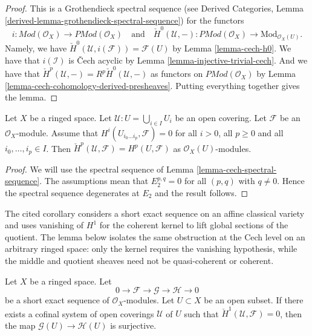 \begin{proof}
This is a Grothendieck spectral sequence
(see
Derived Categories, Lemma \ref{derived-lemma-grothendieck-spectral-sequence})
for the functors
$$
i :  \textit{Mod}(\mathcal{O}_X) \to \textit{PMod}(\mathcal{O}_X)
\quad\text{and}\quad
\check{H}^0(\mathcal{U}, - ) : \textit{PMod}(\mathcal{O}_X)
\to \text{Mod}_{\mathcal{O}_X(U)}.
$$
Namely, we have $\check{H}^0(\mathcal{U}, i(\mathcal{F})) = \mathcal{F}(U)$
by Lemma \ref{lemma-cech-h0}. We have that $i(\mathcal{I})$ is
{\v C}ech acyclic by Lemma \ref{lemma-injective-trivial-cech}. And we
have that $\check{H}^p(\mathcal{U}, -) = R^p\check{H}^0(\mathcal{U}, -)$
as functors on $\textit{PMod}(\mathcal{O}_X)$
by Lemma \ref{lemma-cech-cohomology-derived-presheaves}.
Putting everything together gives the lemma.
\end{proof}

\begin{lemma}
\label{lemma-cech-spectral-sequence-application}
Let $X$ be a ringed space.
Let $\mathcal{U} : U = \bigcup_{i \in I} U_i$ be an open covering.
Let $\mathcal{F}$ be an $\mathcal{O}_X$-module.
Assume that $H^i(U_{i_0 \ldots i_p}, \mathcal{F}) = 0$
for all $i > 0$, all $p \geq 0$ and all $i_0, \ldots, i_p \in I$.
Then $\check{H}^p(\mathcal{U}, \mathcal{F}) = H^p(U, \mathcal{F})$
as $\mathcal{O}_X(U)$-modules.
\end{lemma}

\begin{proof}
We will use the spectral sequence of
Lemma \ref{lemma-cech-spectral-sequence}.
The assumptions mean that $E_2^{p, q} = 0$ for all $(p, q)$ with
$q \not = 0$. Hence the spectral sequence degenerates at $E_2$
and the result follows.
\end{proof}

\begin{lemma}
\label{lemma-ses-cech-h1}
\begin{reference}
\cite[Chapter II, \S 3, no. 46, Theorem 3, Corollary 2,
p. 239]{FAC}
\end{reference}
\begin{history}
The cited corollary considers a short exact sequence on an affine classical
variety and uses vanishing of $H^1$ for the coherent kernel to lift global
sections of the quotient. The lemma below isolates the same obstruction at
the Cech level on an arbitrary ringed space: only the kernel requires the
vanishing hypothesis, while the middle and quotient sheaves need not be
quasi-coherent or coherent.
\end{history}
Let $X$ be a ringed space.
Let
$$
0 \to \mathcal{F} \to \mathcal{G} \to \mathcal{H} \to 0
$$
be a short exact sequence of $\mathcal{O}_X$-modules.
Let $U \subset X$ be an open subset.
If there exists a cofinal system of open coverings $\mathcal{U}$
of $U$ such that $\check{H}^1(\mathcal{U}, \mathcal{F}) = 0$,
then the map $\mathcal{G}(U) \to \mathcal{H}(U)$ is
surjective.
\end{lemma}

